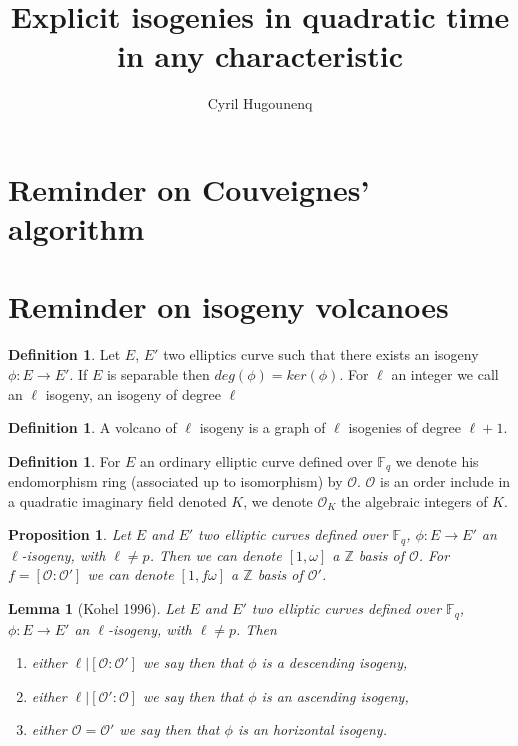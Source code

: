 \documentclass{article}
\title{Explicit isogenies in quadratic time in any characteristic}
\author{Cyril Hugounenq}
\theoremstyle{plain}
\newtheorem{lem}[thm]{Lemma}
\newtheorem{prop}[thm]{Proposition}
\theoremstyle{definition}
\newtheorem{defi}[thm]{Definition}
\theoremstyle{remark}
\begin{document}
\section{Reminder on Couveignes' algorithm}


\section{Reminder on isogeny volcanoes}
\begin{defi}
Let $E$, $E'$ two elliptics curve such that there exists an isogeny $\phi: E \rightarrow E'$. If $E$ is separable then $deg(\phi)=ker(\phi)$. For $\ell$ an integer we call an $\ell$ isogeny, an isogeny of degree $\ell$
\end{defi}

\begin{defi}
A volcano of $\ell$ isogeny is a graph of $\ell$ isogenies of degree $\ell+1$.
\end{defi}

\begin{defi}
For $E$ an ordinary elliptic curve defined over $\mathbb{F}_q$ we denote  his endomorphism ring (associated up to isomorphism) by $\mathcal{O}$. $\mathcal{O}$ is an order include in a quadratic imaginary field denoted $K$, we denote $\mathcal{O}_K$ the algebraic integers of $K$.
\end{defi}

\begin{prop}
Let $E$ and $E'$ two elliptic curves defined over $\mathbb{F}_q$, $\phi :E \rightarrow E'$ an $\ell$-isogeny, with $\ell \neq p$. Then we can denote $[1,\omega]$ a $\mathbb{Z}$ basis of $\mathcal{O}$. For $f=[\mathcal{O} : \mathcal{O}']$ we can denote $[1,f\omega]$ a $\mathbb{Z}$ basis of $\mathcal{O'}$.
\end{prop}

\begin{lem}[Kohel 1996]
Let $E$ and $E'$ two elliptic curves defined over $\mathbb{F}_q$, $\phi :E \rightarrow E'$ an $\ell$-isogeny, with $\ell \neq p$. Then
\begin{enumerate}
\item either $\ell|[\mathcal{O} : \mathcal{O}']$ we say then that $\phi$ is a descending isogeny,
\item either $\ell|[\mathcal{O}':\mathcal{O}]$ we say then that $\phi$ is an ascending isogeny,
\item either $\mathcal{O}=\mathcal{O}'$ we say then that $\phi$ is an horizontal isogeny.
\end{enumerate}
\end{lem}
\end{document}
